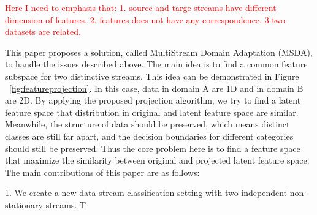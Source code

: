\textcolor{red}{Here I need to emphasis that: 1. source and targe streams have different dimension of features. 2. features does not have any correspondence. 3 two datasets are related.}

This paper proposes a solution, called MultiStream Domain Adaptation (MSDA), to handle the issues described above. The
main idea is to find a common feature subspace for two distinctive streams. This idea can
be demonstrated in Figure ~\ref{fig:featureprojection}. In this case, data in domain A are 1D and in domain B are 2D. By applying the proposed projection algorithm, we
try to find a latent feature space that distribution in original and latent feature space are similar. 
Meanwhile, the structure of data should be preserved, which means distinct classes are still far
apart, and the decision boundaries for different categories should still be preserved.
Thus the core problem here is to find a feature space that maximize the similarity between
original and projected latent feature space. The main contributions of this paper are as follows:

1. We create a new data stream classification setting with two independent non-stationary streams. T



